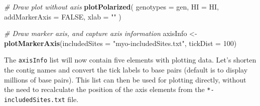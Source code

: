 \documentclass[
]{book}
\newenvironment{Shaded}{\begin{snugshade}}{\end{snugshade}}
\newcommand{\AttributeTok}[1]{\textcolor[rgb]{0.13,0.29,0.53}{#1}}
\newcommand{\CommentTok}[1]{\textcolor[rgb]{0.56,0.35,0.01}{\textit{#1}}}
\newcommand{\ConstantTok}[1]{\textcolor[rgb]{0.56,0.35,0.01}{#1}}
\newcommand{\DecValTok}[1]{\textcolor[rgb]{0.00,0.00,0.81}{#1}}
\newcommand{\FunctionTok}[1]{\textcolor[rgb]{0.13,0.29,0.53}{\textbf{#1}}}
\newcommand{\NormalTok}[1]{#1}
\newcommand{\OtherTok}[1]{\textcolor[rgb]{0.56,0.35,0.01}{#1}}
\newcommand{\SpecialCharTok}[1]{\textcolor[rgb]{0.81,0.36,0.00}{\textbf{#1}}}
\newcommand{\StringTok}[1]{\textcolor[rgb]{0.31,0.60,0.02}{#1}}
\begin{document}
\begin{Shaded}
\begin{Highlighting}[]
\CommentTok{\# Draw plot without axis}
\FunctionTok{plotPolarized}\NormalTok{(}
  \AttributeTok{genotypes =}\NormalTok{ gen,}
  \AttributeTok{HI =}\NormalTok{ HI,}
  \AttributeTok{addMarkerAxis =} \ConstantTok{FALSE}\NormalTok{,}
  \AttributeTok{xlab =} \StringTok{""}
\NormalTok{)}

\CommentTok{\# Draw marker axis, and capture axis information}
\NormalTok{axisInfo }\OtherTok{\textless{}{-}} \FunctionTok{plotMarkerAxis}\NormalTok{(}\AttributeTok{includedSites =} \StringTok{"myo{-}includedSites.txt"}\NormalTok{, }\AttributeTok{tickDist =} \DecValTok{100}\NormalTok{)}
\end{Highlighting}
\end{Shaded}

The \texttt{axisInfo} list will now contain five elements with plotting data. Let's shorten the contig names and convert the tick labels to base pairs (default is to display millions of base pairs). This list can then be used for plotting directly, without the need to recalculate the position of the axis elements from the \texttt{*-includedSites.txt} file.

\begin{Shaded}
\end{Shaded}
\end{document}
